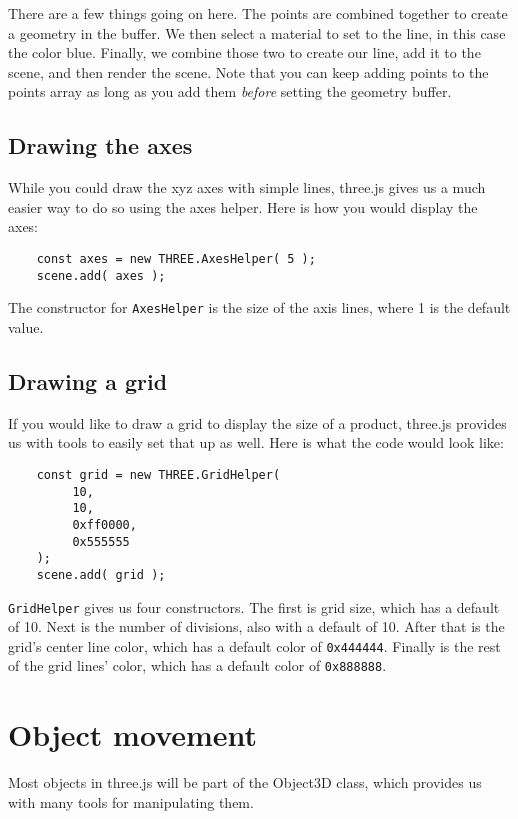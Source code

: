 \documentclass[10pt,final,journal,compsoc]{IEEEtran}
\begin{document}
        There are a few things going on here. The points are combined together to create a geometry in the buffer. We then select a material to set to the line, in this case the color blue. Finally, we combine those two to create our line, add it to the scene, and then render the scene. Note that you can keep adding points to the points array as long as you add them \textit{before} setting the geometry buffer.
    
    \subsection{Drawing the axes}
    While you could draw the xyz axes with simple lines, three.js gives us a much easier way to do so using the axes helper. Here is how you would display the axes:
    
    \begin{lstlisting}
    const axes = new THREE.AxesHelper( 5 );
    scene.add( axes );
    \end{lstlisting}
    
    The constructor for \verb|AxesHelper| is the size of the axis lines, where 1 is the default value.
    
    \subsection{Drawing a grid}
    If you would like to draw a grid to display the size of a product, three.js provides us with tools to easily set that up as well. Here is what the code would look like:
    
    \begin{lstlisting}
    const grid = new THREE.GridHelper(
         10,
         10,
         0xff0000,
         0x555555
    );
    scene.add( grid );
    \end{lstlisting}
    
    \verb|GridHelper| gives us four constructors. The first is grid size, which has a default of 10. Next is the number of divisions, also with a default of 10. After that is the grid's center line color, which has a default color of \verb|0x444444|. Finally is the rest of the grid lines' color, which has a default color of \verb|0x888888|.



\section{Object movement}
Most objects in three.js will be part of the Object3D class, which provides us with many tools for manipulating them.
\end{document}
